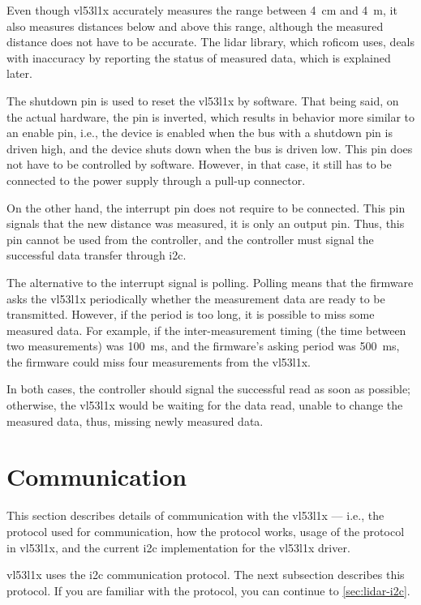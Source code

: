 \documentclass[
  digital,     %
  oneside,     %
  nosansbold,  %
  nocolorbold, %
  nolof,         %
  nolot,         %
]{fithesis4}
\begin{document}
{{{Even though \gls{vl53l1x} accurately measures the range between \qty{4}{\centi\metre} and \qty{4}{\metre}, it also measures distances below and above this range, although the measured distance does not have to be accurate. The lidar library, which \acrshort{roficom} uses, deals with inaccuracy by reporting the status of measured data, which is explained later.

The shutdown pin is used to reset the \gls{vl53l1x} by software. That being said, on the actual hardware, the pin is inverted, which results in behavior more similar to an enable pin, i.e., the device is enabled when the bus with a shutdown pin is driven high, and the device shuts down when the bus is driven low. This pin does not have to be controlled by software. However, in that case, it still has to be connected to the power supply through a pull-up connector.

On the other hand, the interrupt pin does not require to be connected. This pin signals that the new distance was measured, it is only an output pin. Thus, this pin cannot be used from the controller, and the controller must signal the successful data transfer through \acrshort{i2c}.

The alternative to the interrupt signal is polling. Polling means that the firmware asks the \gls{vl53l1x} periodically whether the measurement data are ready to be transmitted. However, if the period is too long, it is possible to miss some measured data. For example, if the inter-measurement timing (the time between two measurements) was \qty{100}{\milli\second}, and the firmware's asking period was \qty{500}{\milli\second}, the firmware could miss four measurements from the \gls{vl53l1x}.

In both cases, the controller should signal the successful read as soon as possible; otherwise, the \gls{vl53l1x} would be waiting for the data read,  unable to change the measured data, thus, missing newly measured data.

\section{ Communication }
This section describes details of communication with the \gls{vl53l1x} --- i.e., the protocol used for communication, how the protocol works, usage of the protocol in \gls{vl53l1x}, and the current \acrshort{i2c} implementation for the \gls{vl53l1x} driver. 

\gls{vl53l1x} uses the \acrshort{i2c} communication protocol. The next subsection describes this protocol. If you are familiar with the protocol, you can continue to \autoref{sec:lidar-i2c}.

}}}
\end{document}
